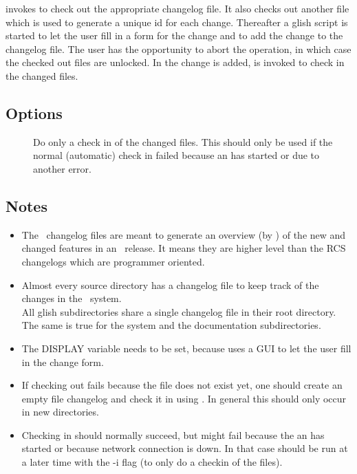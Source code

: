  invokes  to check out the appropriate changelog
file. It also checks out another file which is used to generate a
unique id for each change. Thereafter a glish script is started
to let the user fill in a form for the change and to add the
change to the changelog file. The user has the opportunity to
abort the operation, in which case the checked out files are unlocked.
In the change is added,  is invoked to check in the changed
files.

\subsection*{Options}

\begin{description}
\item[]
   Do only a check in of the changed files.
   This should only be used if the normal (automatic) check in
   failed because an  has started or due to another error.
\end{description}

\subsection*{Notes}

\begin{itemize}
\item
   The \aipspp\ changelog files are meant to generate an overview
   (by ) of the new and changed features
   in an \aipspp\ release.
   It means they are higher level than the RCS changelogs which are
   programmer oriented.

\item
   Almost every source directory has a changelog file to keep track
   of the changes in the \aipspp\ system.
   \\All glish subdirectories share a single changelog file in their
   root directory. The same is true for the system and the
   documentation subdirectories.

\item
   The DISPLAY variable needs to be set, because  uses
   a GUI to let the user fill in the change form.

\item
   If checking out fails because the file does not exist yet,
   one should create an empty file \textrm{changelog} and check it
   in using .
   In general this should only occur in new directories.

\item
   Checking in should normally succeed, but might fail because the
   an  has started or because network connection is down.
   In that case  should be run at a later time with the
   \textrm{-i} flag (to only do a checkin of the files).
\end{itemize}

